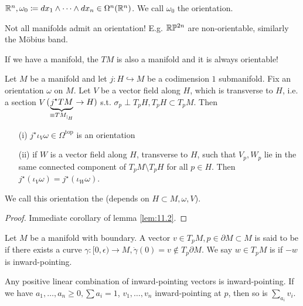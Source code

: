 \begin{example}
    \(\mathbb{R}^n,\omega_0\coloneqq dx_1\wedge\dots\wedge dx_n\in\Omega^n(\mathbb{R}^n)\). We call 
    \(\omega_0\) the  orientation.
\end{example}

\begin{example}
    Not all manifolds admit an orientation! E.g. \(\mathbb{R}\mathbb{P}^{2n}\) are non-orientable, similarly the Möbius band.
\end{example}

If we have a manifold, the \(TM\) is also a manifold and it is always orientable!

\begin{lemma}\label{lem:11.3}
    Let \(M\) be a manifold and let \(j:H\hookrightarrow M\) be a codimension \(1\) submanifold. Fix an orientation 
    \(\omega\) on \(M\). Let \(V\) be a vector field along \(H\), which is transverse to \(H\), i.e. a section \(V\) 
    \((\underbrace{j^\star TM}_{\equiv TM_{|_{H}}}\to H)\) s.t. \(\sigma_p\perp T_p H, T_pH\subset T_p M\).
    Then 
    \begin{enumerate}
        \item[(i)] \(j^\star\iota_V\omega \in \Omega^{\text{top}}\) is an orientation
        \item[(ii)] if \(W\) is a vector field along \(H\), transverse to \(H\), such that \(V_p,W_p\) lie in the same connected component
                    of \(T_pM\setminus T_pH\) for all \(p\in H\). Then \(j^\star(\iota_V\omega)=j^\star(\iota_W\omega)\).   
    \end{enumerate}
    We call this orientation the  (depends on \(H\subset M,\omega,V\)).
\end{lemma}

\begin{proof}
    Immediate corollary of lemma \ref{lem:11.2}.
\end{proof}

\begin{definition*}
    Let \(M\) be a manifold with boundary. A vector \(v\in T_pM,p\in\partial M\subset M\) is said to be 
     if there exists a curve \(\gamma:[0,\epsilon)\to M,\dot{\gamma}(0)=v\notin T_p \partial M\). We say 
    \(w\in T_pM\) is  if \(-w\) is inward-pointing. 
\end{definition*}

 Any positive linear combination of inward-pointing vectors is inward-pointing.
If we have \(a_1,\dots,a_n\geq 0,\sum a_i=1\), \(v_1,\dots,v_n\) inward-pointing at \(p\), then so is \(\sum_{a_i}v_i\).


